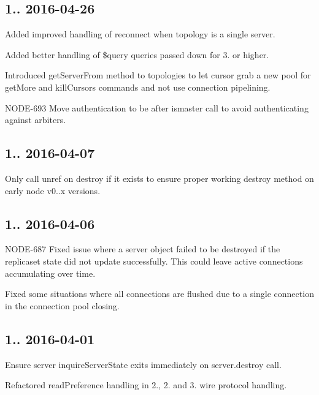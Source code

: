 \subsection*{1.. 2016-\/04-\/26 }


\begin{DoxyItemize}
\item Added improved handling of reconnect when topology is a single server.
\item Added better handling of \$query queries passed down for 3. or higher.
\item Introduced get\+Server\+From method to topologies to let cursor grab a new pool for get\+More and kill\+Cursors commands and not use connection pipelining.
\item N\+O\+D\+E-\/693 Move authentication to be after ismaster call to avoid authenticating against arbiters.
\end{DoxyItemize}

\subsection*{1.. 2016-\/04-\/07 }


\begin{DoxyItemize}
\item Only call unref on destroy if it exists to ensure proper working destroy method on early node v0..\+x versions.
\end{DoxyItemize}

\subsection*{1.. 2016-\/04-\/06 }


\begin{DoxyItemize}
\item N\+O\+D\+E-\/687 Fixed issue where a server object failed to be destroyed if the replicaset state did not update successfully. This could leave active connections accumulating over time.
\item Fixed some situations where all connections are flushed due to a single connection in the connection pool closing.
\end{DoxyItemize}

\subsection*{1.. 2016-\/04-\/01 }


\begin{DoxyItemize}
\item Ensure server inquire\+Server\+State exits immediately on server.\+destroy call.
\item Refactored read\+Preference handling in 2., 2. and 3. wire protocol handling.
\end{DoxyItemize}


